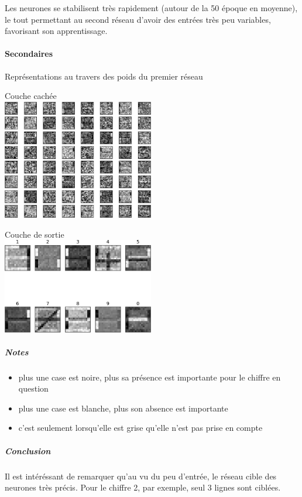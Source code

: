	Les neurones se stabilisent très rapidement (autour de la 50 époque en moyenne), 
	le tout permettant au second réseau d'avoir des entrées très peu variables, favorisant
	son apprentissage.
    \paragraph{Secondaires}
      Représentations au travers des poids du premier réseau
      \begin{center}
	Couche cachée \\
	\includegraphics[width=250px]{data/expA2/representation_hidden.png}
      \end{center}
      \begin{center}
	Couche de sortie \\
	\includegraphics[width=250px]{data/expA2/representation.png}
      \end{center} 
      \subparagraph{Notes}
	\begin{itemize}
	  \item plus une case est noire, plus sa présence est importante pour le chiffre en question
	  \item plus une case est blanche, plus son absence est importante
	  \item c'est seulement lorsqu'elle est grise qu'elle n'est pas prise en compte
	\end{itemize}
      \subparagraph{Conclusion}
      Il est intéréssant de remarquer qu'au vu du peu d'entrée, le réseau cible des neurones très précis.
      Pour le chiffre 2, par exemple, seul 3 lignes sont ciblées.
